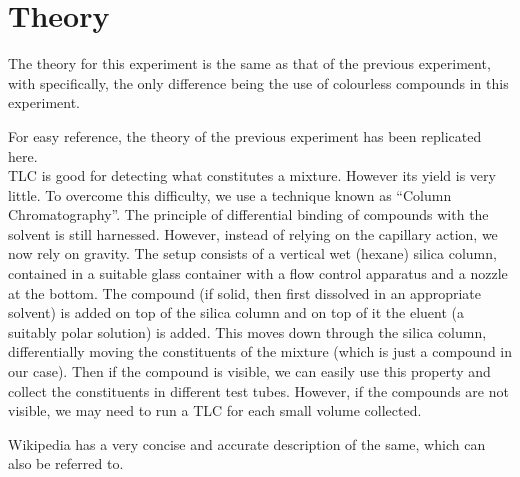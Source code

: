 \section{Theory}
	The theory for this experiment is the same as that of the previous experiment, with specifically, the only difference being the use of colourless compounds in this experiment.
	\par
	For easy reference, the theory of the previous experiment has been replicated here. \\
	TLC is good for detecting what constitutes a mixture. However its yield is very little. To overcome this difficulty, we use a technique known as ``Column Chromatography''. The principle of differential binding of compounds with the solvent is still harnessed. However, instead of relying on the capillary action, we now rely on gravity. The setup consists of a vertical wet (hexane) silica column, contained in a suitable glass container with a flow control apparatus and a nozzle at the bottom. The compound (if solid, then first dissolved in an appropriate solvent) is added on top of the silica column and on top of it the eluent (a suitably polar solution) is added. This moves down through the silica column, differentially moving the constituents of the mixture (which is just a compound in our case). Then if the compound is visible, we can easily use this property and collect the constituents in different test tubes. However, if the compounds are not visible, we may need to run a TLC for each small volume collected.
	\par
	Wikipedia has a very concise and accurate description of the same, which can also be referred to.


